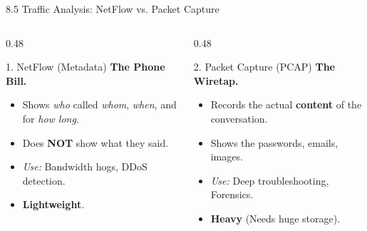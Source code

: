 \documentclass[aspectratio=169]{beamer}  %
\begin{document}
\begin{frame}{8.5 Traffic Analysis: NetFlow vs. Packet Capture}
    \begin{columns}[T]
        \begin{column}{0.48\textwidth}
            \begin{block}{1. NetFlow (Metadata)}
                \footnotesize
                \textbf{The Phone Bill.}
                \begin{itemize}
                    \item Shows \textit{who} called \textit{whom}, \textit{when}, and for \textit{how long}.
                    \item Does \textbf{NOT} show what they said.
                    \item \textit{Use:} Bandwidth hogs, DDoS detection.
                    \item \textbf{Lightweight}.
                \end{itemize}
            \end{block}
        \end{column}
        \begin{column}{0.48\textwidth}
            \begin{block}{2. Packet Capture (PCAP)}
                \footnotesize
                \textbf{The Wiretap.}
                \begin{itemize}
                    \item Records the actual \textbf{content} of the conversation.
                    \item Shows the passwords, emails, images.
                    \item \textit{Use:} Deep troubleshooting, Forensics.
                    \item \textbf{Heavy} (Needs huge storage).
                \end{itemize}
            \end{block}
        \end{column}
    \end{columns}
    \vspace{0.5cm}
    \begin{center}
    \end{center}
\end{frame}
\end{document}
